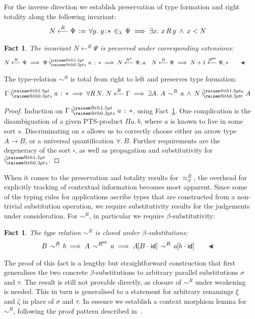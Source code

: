 \documentclass[a4paper,UKenglish]{lipics-v2016}
\makeatletter
\newcommand{\ms}{\,}
\newcommand{\mrel}[1]{\mathrel{\ms #1 \ms}}
\newcommand{\OF}{\mrel{:}}
\newcommand{\mAnd}{\mrel{\wedge}}
\newcommand{\mAll}[1]{\ensuremath{\forall} #1.\ms\ms}
\newcommand{\mEx}[1]{\ensuremath{\exists} #1.\ms\ms}
\newcommand{\eqdef}{\mrel{:=}}
\newcommand{\ty}{\mathsf{ty}}
\newcommand{\of}{\ensuremath{\!:\!}}
\newcommand{\raisemath}[1]{\mathpalette{\raisem@th{#1}}}
\newcommand{\raisem@th}[3]{\raisebox{#1}{\ensuremath{#2#3}}}
\newcommand{\tsAnnot}[2]{\vdash\hspace{-.7em}^{\raisemath{1.5pt}{\scriptscriptstyle{#2}}}_{\raisemath{0.3pt}{\scriptscriptstyle{#1}}}} %
\newcommand{\tfF}{\tsAnnot{\mathsf{F}}{\ty}}  %
\newcommand{\istyF}[2]{\ensuremath{{#1} \mathrel{\tfF} #2}}
\newcommand{\tyL}{\tsAnnot{\lambda}{}} %
\newcommand{\typingL}[3]{\ensuremath{{#1} \mathrel{\tyL} #2 \OF #3}}
\newcommand{\inL}{\mrel{\in_{\lambda}}}
\newcommand{\tyr}{\mathrel{\sim}}
\newcommand{\tmr}{\mathrel{\approx}}
\newcommand{\Rext}[1]{\ensuremath{#1^{\mathsf{ext}}}}
\newcommand{\Rshift}[1]{\ensuremath{#1^{\Uparrow}}}
\newcommand{\tyctxrelLF}[3]{\ensuremath{#1\mathrel{\mathop{\longleftarrow}^{#2}\limits}#3}}
\newcommand{\Prp}{\ensuremath{\textrm{\textasteriskcentered}}}
\newcommand{\Typ}{\ensuremath{\square}}
\newcommand{\All}{\ensuremath{\forall.\,}}
\newcommand{\Prod}[1]{\ensuremath{\Pi #1.\,}}
\newcommand{\subst}[1]{\hphantom{|}\!\![{#1}]}
\newcommand{\scons}{\mathbin{\hspace{0.05em}\cdot\hspace{0.05em}}}
\newcommand{\id}{\mathsf{id}}
\theoremstyle{plain}
\newtheorem{fact}[theorem]{Fact}
\makeatother
\begin{document}
For the inverse direction we establish preservation of type formation and right totality along the following invariant:
\begin{align*}
  \tyctxrelLF{N}{R}{\Psi} \eqdef \mAll {y} y\of\Prp \inL \Psi \implies \mEx x x\,R\,y \mAnd x < N
\end{align*}
\begin{fact}
  \label{fac:inv-tylf-ext}
  The invariant $\tyctxrelLF{N}{R}{\Psi}$ is preserved under corresponding extensions:
  \begin{align*}
    &\tyctxrelLF{N}{R}{\Psi} \implies \typingL{\Psi}{a}{\Prp} \implies \tyctxrelLF{N}{\Rshift{R}}{\Psi,a} & &\tyctxrelLF{N}{R}{\Psi} \implies \tyctxrelLF{N+1}{\Rext{R}}{\Psi,\Prp}\tag*{\qedsymbol}
  \end{align*}
\end{fact}
\begin{lemma}
  \label{lem:tyr_lf_tot_pres}
  The type-relation $\tyr^R$ is total from right to left and preserves type formation:
  \begin{align*}
    \typingL{\Gamma}{a}{\Prp} \implies \mAll {R\,N} \tyctxrelLF{N}{R}{\Gamma} \implies \mEx A A\,\tyr^R\,a \mAnd \istyF{N}{A}
  \end{align*}
\end{lemma}
\begin{proof}
  Induction on $\typingL{\Gamma}{a}{\Prp}$, using Fact~\ref{fac:inv-tylf-ext}.
  One complication is the disambiguation of a given PTS-product $\Prod{a} b$, where $a$ is known to live in some sort $s$.
  Discriminating on $s$ allows us to correctly choose either an arrow type $A \to B$, or a universal quantification $\All B$.
  Further requirements are the degeneracy of the sort $\Typ$, as well as propagation and substitutivity for $\tyL$.
\end{proof}

When it comes to the preservation and totality results for $\tmr^R_S$, the overhead for explicitly tracking of contextual information becomes most apparent.
Since some of the typing rules for applications ascribe types that are constructed from a non-trivial substitution operation, we require substitutivity results for the judgements under consideration.
For $\tyr^R$, in particular we require $\beta$-substitutivity:
\begin{fact}
  The type relation $\tyr^R$ is closed under $\beta$-substitutions:
  \begin{align*}
    B\,\tyr^R\,b \implies A\,\tyr^{\Rext{R}}\,a \implies A\subst{B\scons\id}\,\tyr^R\,a\subst{b\scons\id} \tag*{\qedsymbol}
  \end{align*}
\end{fact}
The proof of this fact is a lengthy but straightforward construction that first generalises the two concrete $\beta$-substitutions to arbitrary parallel substitutions $\sigma$ and $\tau$.
The result is still not provable directly, as closure of $\tyr^R$ under weakening is needed.
This in turn is generalised to a statement for arbitrary renamings $\xi$ and $\zeta$ in place of $\sigma$ and $\tau$.
In essence we establish a context morphism lemma for $\tyr^R$, following the proof pattern described in~\cite{KaiserEtAl:2017:sysf_pts_equiv_coq}.
\end{document}
